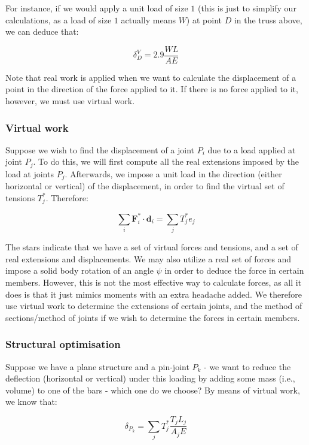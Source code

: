 \documentclass{article}
\begin{document}
For instance, if we would apply a unit load of size $1$ (this is just to simplify our calculations, as a load of size $1$ actually means $W$) at point $D$ in the truss above, we can deduce that:

\[ \delta_{D}^V = 2.9 \frac{WL}{AE} \]

Note that real work is applied when we want to calculate the displacement of a point in the direction of the force applied to it. If there is no force applied to it, however, we must use virtual work.

\subsubsection{Virtual work}

\begin{proposition}
    Suppose we wish to find the displacement of a joint $P_i$ due to a load applied at joint $P_j$. To do this, we will first compute all the real extensions imposed by the load at joints $P_j$. Afterwards, we impose a unit load in the direction (either horizontal or vertical) of the displacement, in order to find the virtual set of tensions $T^*_j$. Therefore:

    \[ \sum_i \mathbf{F}_i^* \cdot \mathbf{d}_i = \sum_j T_j^* e_j \]

    The stars indicate that we have a set of virtual forces and tensions, and a set of real extensions and displacements. We may also utilize a real set of forces and impose a solid body rotation of an angle $\psi$ in order to deduce the force in certain members. However, this is not the most effective way to calculate forces, as all it does is that it just mimics moments with an extra headache added. We therefore use virtual work to determine the extensions of certain joints, and the method of sections/method of joints if we wish to determine the forces in certain members.
\end{proposition}

\subsubsection{Structural optimisation}

Suppose we have a plane structure and a pin-joint $P_k$ - we want to reduce the deflection (horizontal or vertical) under this loading by adding some mass (i.e., volume) to one of the bars - which one do we choose? By means of virtual work, we know that:

\[ \delta_{P_k} = \sum_j T_j^* \frac{T_jL_j}{A_jE} \]
\end{document}
